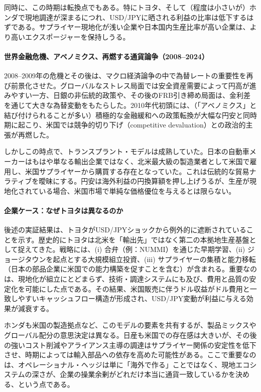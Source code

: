 \documentclass[12pt,a4paper]{article}
\begin{document}
同時に、この時期は転換点でもある。特にトヨタ、そして（程度は小さいが）ホンダで現地調達が深まるにつれ、USD/JPYに晒される利益の比率は低下するはずである。サプライヤー現地化が浅い企業や日本国内生産比率が高い企業は、より高いエクスポージャーを保持しうる。

\paragraph{世界金融危機、アベノミクス、再燃する通貨論争（2008--2024）}

2008--2009年の危機とその後は、マクロ経済論争の中で為替レートの重要性を再び前景化させた。グローバルなストレス局面では安全資産需要によって円高が進みやすい一方、日銀の非伝統的政策や、その後のFRB引き締め局面は、金利差を通じて大きな為替変動をもたらした。2010年代初頭には、（「アベノミクス」と結び付けられることが多い）積極的な金融緩和への政策転換が大幅な円安と同時期に起こり、米国では競争的切り下げ（competitive devaluation）との政治的主張が再燃した。

しかしこの時点で、トランスプラント・モデルは成熟していた。日本の自動車メーカーはもはや単なる輸出企業ではなく、北米最大級の製造業者として米国で雇用し、米国サプライヤーから購買する存在となっていた。これは伝統的な貿易ナラティブを曖昧にする。円安は海外利益の円換算額を押し上げうるが、生産が現地化されている場合、米国市場で単純な価格優位を与えるとは限らない。

\paragraph{企業ケース：なぜトヨタは異なるのか}

後述の実証結果は、トヨタがUSD/JPYショックから例外的に遮断されていることを示す。歴史的にトヨタは北米を「輸出先」ではなく第二の本拠地生産基盤として捉えてきた。戦略には、(i) 合弁（例：NUMMI）を通じた早期学習、(ii) ジョージタウンを起点とする大規模組立投資、(iii) サプライヤーの集積と能力移転（日本の部品企業に米国での能力構築を促すことを含む）が含まれる。重要なのは、現地化が組立にとどまらず、技術・調達システムにも及び、費用と品質の安定化を可能にした点である。その結果、米国販売に伴うドル収益がドル費用と一致しやすいキャッシュフロー構造が形成され、USD/JPY変動が利益に与える効果が減衰する。

ホンダも米国の製造拠点など、このモデルの要素を共有するが、製品ミックスやグローバル配分の意思決定は異なる。日産も米国での存在感は大きいが、その後の強いコスト削減やアライアンス主導の調達はサプライヤー関係の安定性を低下させ、時期によっては輸入部品への依存を高めた可能性がある。ここで重要なのは、オペレーショナル・ヘッジは単に「海外で作る」ことではなく、現地エコシステムの深さが、企業の操業余剰がどれだけ本当に通貨一致しているかを決める、という点である。
\end{document}
